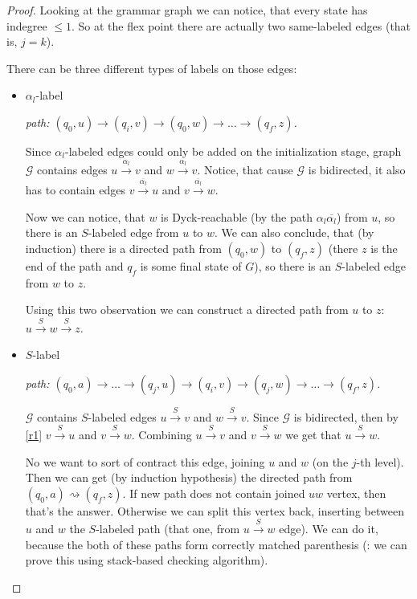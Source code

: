 \begin{proof}
Looking at the grammar graph we can notice, that every state has indegree $\le 1$. So at the flex point there are actually two same-labeled edges (that is, $j = k$). 

There can be three different types of labels on those edges:

\begin{itemize}
    \item $\alpha_l$-label

        \textit{path: $(q_0, u) \rightarrow (q_i, v) \rightarrow (q_0, w) \rightarrow \dots \rightarrow (q_f, z)$.}

        Since $\alpha_l$-labeled edges could only be added on the initialization stage, 
        graph $\mathcal{G}$ contains edges $u \xrightarrow{\alpha_l} v$ and $w \xrightarrow{\alpha_l} v$. Notice, that cause $\mathcal{G}$ is bidirected, it also has to contain edges $v \xrightarrow{\overline{\alpha_l}} u$ and $v \xrightarrow{\overline{\alpha_l}} w$.

        Now we can notice, that $w$ is Dyck-reachable (by the path $\alpha_l \overline{\alpha_l}$) from $u$, so there is an $S$-labeled edge from $u$ to $w$. We can also conclude, that (by induction) there is a directed path from $(q_0, w)$ to $(q_f, z)$ (there $z$ is the end of the path and $q_f$ is some final state of $G$), so there is an $S$-labeled edge from $w$ to $z$. 

        Using this two observation we can construct a directed path from $u$ to $z$: $u \xrightarrow{S} w \xrightarrow{S} z$. 
    \item $S$-label

        \textit{path: $(q_0, a) \rightarrow \dots \rightarrow (q_j, u) \rightarrow (q_i, v) \rightarrow (q_j, w) \rightarrow \dots \rightarrow (q_f, z)$.}

        $\mathcal{G}$ contains $S$-labeled edges $u \xrightarrow{S} v$ and $w \xrightarrow{S} v$. Since $\mathcal{G}$ is bidirected, then by \ref{r1} $v \xrightarrow{S} u$ and $v \xrightarrow{S} w$. Combining $u \xrightarrow{S} v$ and $v \xrightarrow{S} w$ we get that $u \xrightarrow{S} w$. 

        No we want to sort of contract this edge, joining $u$ and $w$ (on the $j$-th level). Then we can get (by induction hypothesis) the directed path from $(q_0, a) \rightsquigarrow (q_f, z)$. If new path does not contain joined $uw$ vertex, then that's the answer. Otherwise we can split this vertex back, inserting between $u$ and $w$ the $S$-labeled path (that one, from $u \xrightarrow{S} w$ edge). We can do it, because the both of these paths form correctly matched parenthesis ({\color{red}{TODO}}: we can prove this using stack-based checking algorithm).


\end{itemize}
\end{proof}
